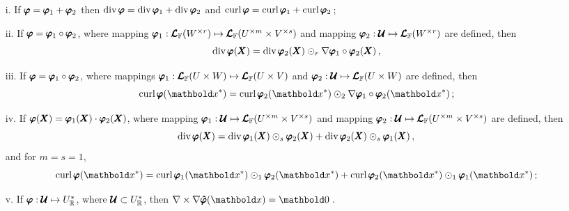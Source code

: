 \begin{itemize}
\setlength\itemsep{.1em}
\item[i.] If $\pmb{\varphi}=\pmb{\varphi}_1+\pmb{\varphi}_2$ then $\operatorname{div}{\pmb{\varphi}}=\operatorname{div}{\pmb{\varphi}_1}+\operatorname{div}{\pmb{\varphi}_2}$ and $\operatorname{curl}{\pmb{\varphi}}=\operatorname{curl}{\pmb{\varphi}_1}+\operatorname{curl}{\pmb{\varphi}_2}\,$;
\item[ii.] If $\pmb{\varphi}=\pmb{\varphi}_1\circ\pmb{\varphi}_2$, where mapping $\pmb{\varphi}_1 : \pmb{\mathcal{L}}_{\mathbb{F}}(W^{\times r}) \mapsto \pmb{\mathcal{L}}_{\mathbb{F}}(U^{\times m}\times V^{\times s})$ and mapping $\pmb{\varphi}_2 : \pmb{\mathcal{U}} \mapsto \pmb{\mathcal{L}}_{\mathbb{F}}(W^{\times r})$ are defined, then
\begin{equation}
\operatorname{div}{\pmb{\varphi}}(\pmb{X}) =\operatorname{div}{\pmb{\varphi}_2}(\pmb{X})\odot_{r}\nabla\pmb{\varphi}_1\circ\pmb{\varphi}_2(\pmb{X})\,,
\end{equation}	
\item[iii.] If $\pmb{\varphi}=\pmb{\varphi}_1\circ\pmb{\varphi}_2$, where mappings $\pmb{\varphi}_1 : \pmb{\mathcal{L}}_{\mathbb{F}}(U\times W) \mapsto \pmb{\mathcal{L}}_{\mathbb{F}}(U\times V)$ and $\pmb{\varphi}_2 : \pmb{\mathcal{U}} \mapsto \pmb{\mathcal{L}}_{\mathbb{F}}(U\times W)$ are defined, then
\begin{equation}
\fua{\crl{\tnr{\varphi}}}{\vto{x}^*} = \fua{\crl{\tnr{\varphi}_2}}{\vto{x}^*}\odot_{2}\fua{\nabla\tnr{{\varphi}}_1\circ\tnr{\varphi}_2}{\vto{x}^*}\,;
\end{equation}	

\item[iv.] If $\pmb{\varphi}(\pmb{X})=\pmb{\varphi}_1(\pmb{X})\cdot\pmb{\varphi}_2(\pmb{X})$, where mapping  $\pmb{\varphi}_1 : \pmb{\mathcal{U}} \mapsto \pmb{\mathcal{L}}_{\mathbb{F}}(U^{\times m}\times V^{\times s})$ and mapping $\pmb{\varphi}_2 : \pmb{\mathcal{U}} \mapsto \pmb{\mathcal{L}}_{\mathbb{F}}(U^{\times m}\times V^{\times s})$ are defined, then
\begin{equation}
\operatorname{div}{\pmb{\varphi}}(\pmb{X}) = \operatorname{div}{\pmb{\varphi}_1}(\pmb{X})\odot_s\pmb{\varphi}_2(\pmb{X})+\operatorname{div}{\pmb{\varphi}_2}(\pmb{X})\odot_s\pmb{\varphi}_1(\pmb{X})\,,
\end{equation}	
and for $m=s=1$,
\begin{equation}
\fua{\crl{\tnr{\varphi}}}{\vto{x}^*} = \fua{\crl{\tnr{\varphi}_1}}{\vto{x}^*}\odot_1\fua{\tnr{\varphi}_2}{\vto{x}^*}+\fua{\crl{\tnr{\varphi}_2}}{\vto{x}^*}\odot_1\fua{\tnr{\varphi}_1}{\vto{x}^*}\,;
\end{equation}

	
\item[v.]	If $\pmb{\varphi} : \pmb{\mathcal{U}} \mapsto U_{\mathbb{R}}^*$, where $\pmb{\mathcal{U}}\subset U_{\mathbb{R}}^*$, then $\fua{{\nabla \times \nabla\tnr{\hat{\varphi}}}}{\vto{x}}=\vto{0}\,$.
\end{itemize}

